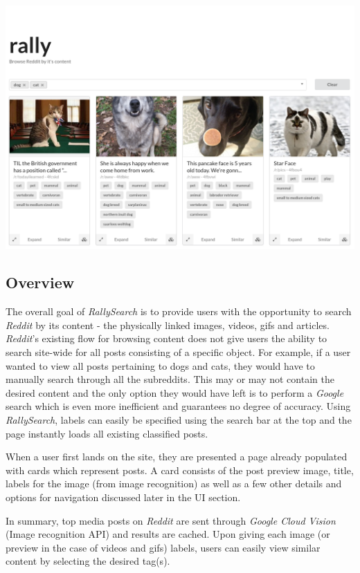 \documentclass[msc,oneside]{ubcthesis}%
\begin{document}
\includegraphics[width=\textwidth]{rallysearch_screenshot.png}

\subsection{Overview}
The overall goal of \textit{RallySearch} is to provide users with the opportunity to search \textit{Reddit} by its content - the physically linked images, videos, gifs and articles. \textit{Reddit}'s existing flow for browsing content does not give users the ability to search site-wide for all posts consisting of a specific object. For example, if a user wanted to view all posts pertaining to dogs and cats, they would have to manually search through all the subreddits. This may or may not contain the desired content and the only option they would have left is to perform a \textit{Google} search which is even more inefficient and guarantees no degree of accuracy. Using \textit{RallySearch}, labels can easily be specified using the search bar at the top and the page instantly loads all existing classified posts.

When a user first lands on the site, they are presented a page already populated with cards which represent posts. A card consists of the post preview image, title, labels for the image (from image recognition) as well as a few other details and options for navigation discussed later in the UI section.

In summary, top media posts on \textit{Reddit} are sent through \textit{Google Cloud Vision} (Image recognition API) and results are cached. Upon giving each image (or preview in the case of videos and gifs) labels, users can easily view similar content by selecting the desired tag(s). 
\end{document}
